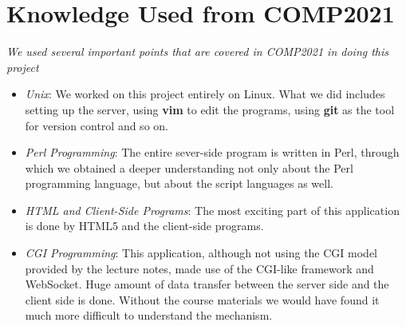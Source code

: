 \documentclass[a4paper,11pt,3p]{article}
\begin{document}
\section{Knowledge Used from COMP2021}
\emph{We used several important points that are covered in COMP2021 in doing this project}\\

\begin{itemize}
\item
\emph{Unix}: We worked on this project entirely on Linux. What we did includes setting up the 
server, using \textbf{vim} to edit the programs, using \textbf{git} as the tool for version 
control and so on.\\

\item
\emph{Perl Programming}: The entire sever-side program is written in Perl, through which we 
obtained a deeper understanding not only about the Perl programming language, but about the 
script languages as well.\\

\item
\emph{HTML and Client-Side Programs}: The most exciting part of this application is done by 
HTML5 and the client-side programs.\\

\item
\emph{CGI Programming}: This application, although not using the CGI model provided by the 
lecture notes, made use of the CGI-like framework and WebSocket. Huge amount of data transfer between the 
server side and the client side is done. Without the course materials we would have found it 
much more difficult to understand the mechanism.\\

\end{itemize}
\end{document}
